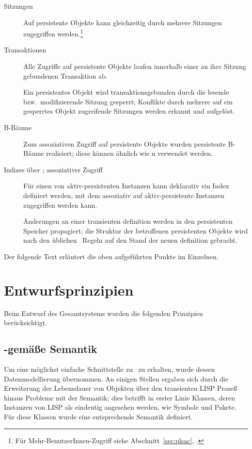 \begin{description}
%
\item[Sitzungen]
Auf persistente Objekte kann gleichzeitig durch mehrere Sitzungen
zugegriffen werden.\footnote{F\"{u}r Mehr-BenutzerInnen-Zugriff siehe
Abschnitt~\ref{sec:plsac}, \citepage{\pageref{sec:plsac}}.}
%
\item[Transaktionen]
Alle Zugriffe auf persistente Objekte laufen innerhalb einer an ihre
Sitzung gebundenen Transaktion ab.
%
\item[{}]
Ein persistentes Objekt wird transaktionsgebunden durch die lesende
bzw.\ modifizierende Sitzung gesperrt; Konflikte durch mehrere auf
ein gesperrtes Objekt zugreifende Sitzungen werden erkannt und
aufgel\"{o}st.
%
\item[B-B\"{a}ume]
Zum assoziativen Zugriff auf persistente Objekte wurden persistente
B-B\"{a}ume realisiert; diese k\"{o}n\-nen \"{a}hn\-lich wie \hashtbl{}n
verwendet werden.
%
\item[Indizes \"{u}ber {\Slt[s]}; assoziativer Zugriff]
F\"{u}r einen \Slt\/ von aktiv-persistenten Instanzen kann deklarativ
ein Index definiert werden, mit dem assoziativ auf aktiv-persistente
Instanzen zugegriffen werden kann.
%
\item[]
\"{A}nderungen an einer transienten \cls[n]definition werden in den
persistenten Speicher propagiert; die Struktur der betroffenen
persistenten Objekte wird nach den \"{u}blichen \clos\ Regeln auf den
Stand der neuen \cls[n]definition gebracht.
%
\end{description}
%
Der folgende Text erl\"{a}utert die oben aufgef\"{u}hrten Punkte im
Einzelnen.
%
\section{Entwurfsprinzipien}
%
Beim Entwurf des Gesamtsystems wurden die folgenden Prinzipien
ber\"{u}cksichtigt.
%
\subsection{\protect\cl-gem\"{a}\ss{}e Semantik}
%
Um eine m\"{o}glichst einfache Schnittstelle zu \cl\ zu erhalten, wurde
dessen Datenmodellierung \"{u}bernommen. An einigen Stellen ergaben sich
durch die Erweiterung der Lebensdauer von Objekten \"{u}ber den transienten
LISP Proze\ss{} hinaus Probleme mit der Semantik; dies betrifft in erster
Linie Klassen, deren Instanzen von LISP als eindeutig angesehen
werden, wie Symbole und Pakete. F\"{u}r diese Klassen wurde eine
entsprechende Semantik definiert.
%
